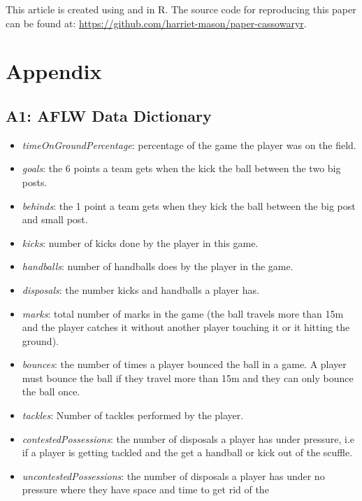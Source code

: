 This article is created using  \citep{knitr} and
 \citep{rmarkdown} in R. The source code for
reproducing this paper can be found at:
\url{https://github.com/harriet-mason/paper-cassowaryr}.

\hypertarget{appendix}{%
\section{Appendix}\label{appendix}}

\hypertarget{a1-aflw-data-dictionary}{%
\subsection{A1: AFLW Data Dictionary}\label{a1-aflw-data-dictionary}}

\begin{itemize}
\tightlist
\item
  \emph{timeOnGroundPercentage}: percentage of the game the player was
  on the field.
\item
  \emph{goals}: the 6 points a team gets when the kick the ball between
  the two big posts.
\item
  \emph{behinds}: the 1 point a team gets when they kick the ball
  between the big post and small post.
\item
  \emph{kicks}: number of kicks done by the player in this game.
\item
  \emph{handballs}: number of handballs does by the player in the game.
\item
  \emph{disposals}: the number kicks and handballs a player has.
\item
  \emph{marks}: total number of marks in the game (the ball travels more
  than 15m and the player catches it without another player touching it
  or it hitting the ground).
\item
  \emph{bounces}: the number of times a player bounced the ball in a
  game. A player must bounce the ball if they travel more than 15m and
  they can only bounce the ball once.
\item
  \emph{tackles}: Number of tackles performed by the player.
\item
  \emph{contestedPossessions}: the number of disposals a player has
  under pressure, i.e if a player is getting tackled and the get a
  handball or kick out of the scuffle.
\item
  \emph{uncontestedPossessions}: the number of disposals a player has
  under no pressure where they have space and time to get rid of the

\end{itemize}
